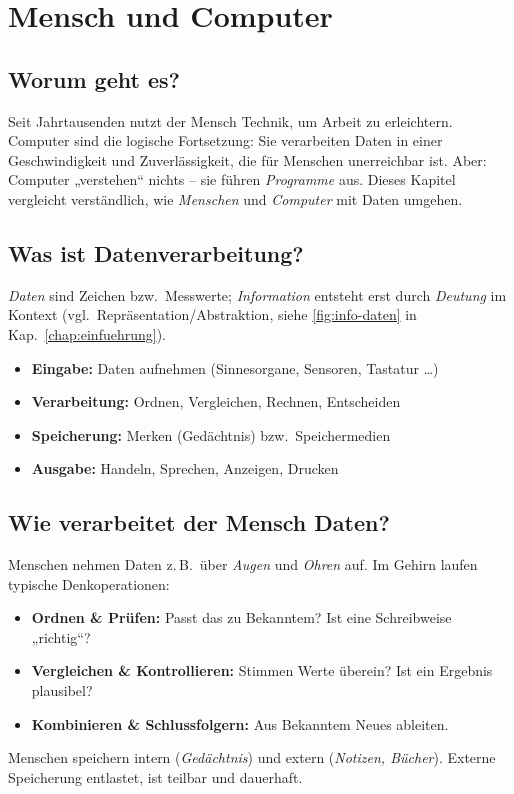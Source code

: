 \documentclass[../skript/main.tex]{subfiles}
\begin{document}
\label{chap:menschcomputer}
	
	\chapter{Mensch und Computer}
	\section{Worum geht es?}
	Seit Jahrtausenden nutzt der Mensch Technik, um Arbeit zu erleichtern. Computer sind die
	logische Fortsetzung: Sie verarbeiten Daten in einer Geschwindigkeit und Zuverlässigkeit, die
	für Menschen unerreichbar ist. Aber: Computer „verstehen“ nichts – sie führen \emph{Programme}
	aus. Dieses Kapitel vergleicht verständlich, wie \emph{Menschen} und \emph{Computer} mit Daten
	umgehen.
	
	\section{Was ist Datenverarbeitung?}
	\emph{Daten} sind Zeichen bzw.\ Messwerte; \emph{Information} entsteht erst durch \emph{Deutung}
	im Kontext (vgl.\ Repräsentation/Abstraktion, siehe \autoref{fig:info-daten} in Kap.\ \autoref{chap:einfuehrung}).
	\begin{itemize}
		\item \textbf{Eingabe:} Daten aufnehmen (Sinnesorgane, Sensoren, Tastatur \dots)
		\item \textbf{Verarbeitung:} Ordnen, Vergleichen, Rechnen, Entscheiden
		\item \textbf{Speicherung:} Merken (Gedächtnis) bzw.\ Speichermedien
		\item \textbf{Ausgabe:} Handeln, Sprechen, Anzeigen, Drucken
	\end{itemize}
	
	\section{Wie verarbeitet der Mensch Daten?}
	Menschen nehmen Daten z.\,B.\ über \emph{Augen} und \emph{Ohren} auf. Im Gehirn laufen typische
	Denkoperationen:
	\begin{itemize}
		\item \textbf{Ordnen \& Prüfen:} Passt das zu Bekanntem? Ist eine Schreibweise „richtig“?
		\item \textbf{Vergleichen \& Kontrollieren:} Stimmen Werte überein? Ist ein Ergebnis plausibel?
		\item \textbf{Kombinieren \& Schlussfolgern:} Aus Bekanntem Neues ableiten.
	\end{itemize}
	Menschen speichern intern (\emph{Gedächtnis}) und extern (\emph{Notizen, Bücher}). Externe
	Speicherung entlastet, ist teilbar und dauerhaft.
	
\end{document}
